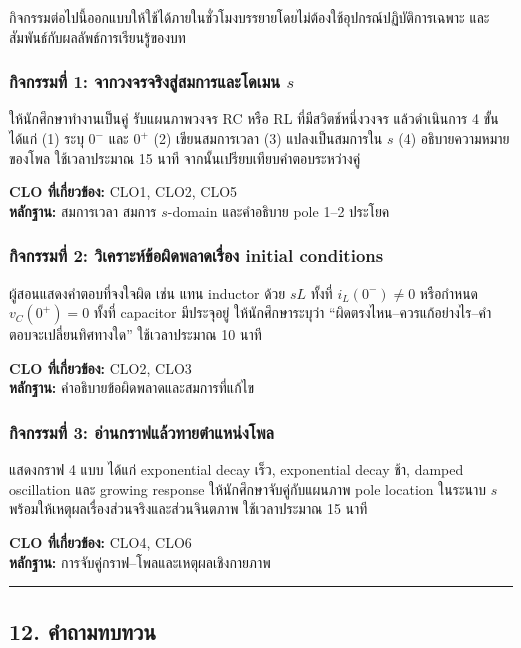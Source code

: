 กิจกรรมต่อไปนี้ออกแบบให้ใช้ได้ภายในชั่วโมงบรรยายโดยไม่ต้องใช้อุปกรณ์ปฏิบัติการเฉพาะ และสัมพันธ์กับผลลัพธ์การเรียนรู้ของบท

\subsubsection{กิจกรรมที่ 1: จากวงจรจริงสู่สมการและโดเมน \texorpdfstring{$s$}{s}}

ให้นักศึกษาทำงานเป็นคู่ รับแผนภาพวงจร RC หรือ RL ที่มีสวิตช์หนึ่งวงจร แล้วดำเนินการ 4 ขั้น ได้แก่ (1) ระบุ $0^-$ และ $0^+$ (2) เขียนสมการเวลา (3) แปลงเป็นสมการใน $s$ (4) อธิบายความหมายของโพล ใช้เวลาประมาณ 15 นาที จากนั้นเปรียบเทียบคำตอบระหว่างคู่

\textbf{CLO ที่เกี่ยวข้อง:} CLO1, CLO2, CLO5\\
\textbf{หลักฐาน:} สมการเวลา สมการ $s$-domain และคำอธิบาย pole 1–2 ประโยค

\subsubsection{กิจกรรมที่ 2: วิเคราะห์ข้อผิดพลาดเรื่อง initial conditions}

ผู้สอนแสดงคำตอบที่จงใจผิด เช่น แทน inductor ด้วย $sL$ ทั้งที่ $i_L(0^-)\neq0$ หรือกำหนด $v_C(0^+)=0$ ทั้งที่ capacitor มีประจุอยู่ ให้นักศึกษาระบุว่า “ผิดตรงไหน–ควรแก้อย่างไร–คำตอบจะเปลี่ยนทิศทางใด” ใช้เวลาประมาณ 10 นาที

\textbf{CLO ที่เกี่ยวข้อง:} CLO2, CLO3\\
\textbf{หลักฐาน:} คำอธิบายข้อผิดพลาดและสมการที่แก้ไข

\subsubsection{กิจกรรมที่ 3: อ่านกราฟแล้วทายตำแหน่งโพล}

แสดงกราฟ 4 แบบ ได้แก่ exponential decay เร็ว, exponential decay ช้า, damped oscillation และ growing response ให้นักศึกษาจับคู่กับแผนภาพ pole location ในระนาบ $s$ พร้อมให้เหตุผลเรื่องส่วนจริงและส่วนจินตภาพ ใช้เวลาประมาณ 15 นาที

\textbf{CLO ที่เกี่ยวข้อง:} CLO4, CLO6\\
\textbf{หลักฐาน:} การจับคู่กราฟ–โพลและเหตุผลเชิงกายภาพ

\par\noindent\rule{\textwidth}{0.4pt}\par

\subsection{12. คำถามทบทวน}

